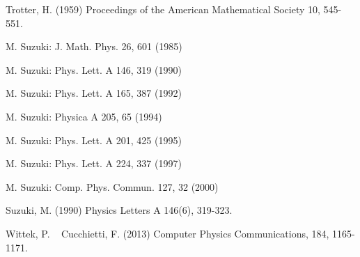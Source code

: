 \begin{thebibliography}{9}


  Trotter, H. (1959) Proceedings of the American Mathematical Society 10, 545-551.

M. Suzuki: J. Math. Phys. 26, 601 (1985)

M. Suzuki: Phys. Lett. A 146, 319 (1990)

M. Suzuki: Phys. Lett. A 165, 387 (1992)

M. Suzuki: Physica A 205, 65 (1994)

M. Suzuki: Phys. Lett. A 201, 425 (1995)

M. Suzuki: Phys. Lett. A 224, 337 (1997)

M. Suzuki: Comp. Phys. Commun. 127, 32 (2000)

  Suzuki, M. (1990) Physics Letters A 146(6), 319-323.

  Wittek, P. ~ Cucchietti, F. (2013) Computer Physics Communications, 184, 1165-1171.
  
\end{thebibliography}